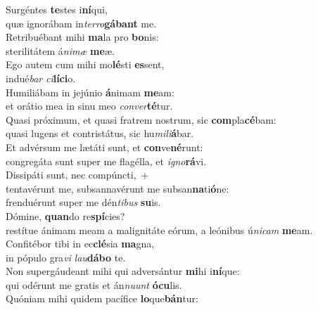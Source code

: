 \oddverse Surgéntes \textbf{te}stes i\textbf{ní}qui,~\*\\
\oddverse quæ ignorábam in\textit{ter}\textit{ro}\textbf{gá}\textbf{bant} me.\\
\evenverse Retribuébant mihi \textbf{ma}la pro \textbf{bo}nis:~\*\\
\evenverse sterilitátem á\textit{ni}\textit{mæ} \textbf{me}æ.\\
\oddverse Ego autem cum mihi mo\textbf{lé}sti \textbf{es}sent,~\*\\
\oddverse indué\textit{bar} \textit{ci}\textbf{lí}\textbf{ci}o.\\
\evenverse Humiliábam in jejúnio \textbf{á}nimam \textbf{me}am:~\*\\
\evenverse et orátio mea in sinu meo \textit{con}\textit{ver}\textbf{té}tur.\\
\oddverse Quasi próximum, et quasi fratrem nostrum, sic \textbf{com}pla\textbf{cé}bam:~\*\\
\oddverse quasi lugens et contristátus, sic hu\textit{mi}\textit{li}\textbf{á}bar.\\
\evenverse Et advérsum me lætáti sunt, et \textbf{con}ve\textbf{né}runt:~\*\\
\evenverse congregáta sunt super me flagélla, et \textit{i}\textit{gno}\textbf{rá}vi.\\
\oddverse Dissipáti sunt, nec compúncti,~+\\
\oddverse  tentavérunt me, subsannavérunt me subsan\textbf{na}ti\textbf{ó}ne:~\*\\
\oddverse frenduérunt super me dén\textit{ti}\textit{bus} \textbf{su}is.\\
\evenverse Dómine, \textbf{quan}do re\textbf{spí}cies?~\*\\
\evenverse restítue ánimam meam a malignitáte eórum, a leónibus ú\textit{ni}\textit{cam} \textbf{me}am.\\
\oddverse Confitébor tibi in ec\textbf{clé}sia \textbf{ma}gna,~\*\\
\oddverse in pópulo gra\textit{vi} \textit{lau}\textbf{dá}\textbf{bo} te.\\
\evenverse Non supergáudeant mihi qui adversántur \textbf{mi}hi i\textbf{ní}que:~\*\\
\evenverse qui odérunt me gratis et án\textit{nu}\textit{unt} \textbf{ó}\textbf{cu}lis.\\
\oddverse Quóniam mihi quidem pacífice \textbf{lo}que\textbf{bán}tur:~\*\\
